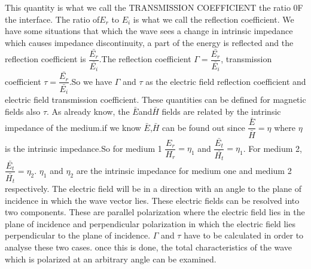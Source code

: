 This quantity is what we call the TRANSMISSION COEFFICIENT the ratio 0F the interface. The ratio of$ E_r$ to $E_i$ is what we call the reflection coefficient. We have some situations that which the wave sees a change in intrinsic impedance which causes impedance discontinuity, a part of the energy is reflected and the reflection coefficient is $\dfrac{\bar{E_r}}{\bar{E_i}}$.The reflection coefficient $\Gamma=\dfrac{\bar{E_r}}{\bar{E_i}}$, transmission coefficient $\tau=\dfrac{\bar{E_r}}{\bar{E_i}}$.So we have $\Gamma$ and $\tau$ as the electric field reflection coefficient and electric field transmission coefficient. These quantities can be defined for magnetic fields also $\tau$. As already know, the $\bar{E}$and$\bar{ H}$ fields are related by the intrinsic impedance of the medium.if we know $\bar{E}$,$\bar{H}$ can be found out since $\dfrac{\bar{E}}{\bar{H}}=\eta$ where $\eta$ is the intrinsic impedance.So for medium 1 $\dfrac{E_r}{H_r}=\eta_1$  and $\dfrac{\bar{E_t}}{\bar{H_t}}=\eta_1$. For medium 2,$\dfrac{\bar{E_t}}{\bar{H_t}}=\eta_2$. $\eta_1$ and $\eta_2$ are the intrinsic impedance for medium one and medium 2 respectively. The electric field will be in a direction with an angle to the plane of incidence in which the wave vector lies. These electric fields can be resolved into two components. These are parallel polarization where the electric field lies in the plane of incidence and perpendicular polarization in which the electric field lies perpendicular to the plane of incidence. $\Gamma$ and $\tau$ have to be calculated in order to analyse these two cases. once this is done, the total characteristics of the wave which is polarized at an arbitrary angle can be examined.